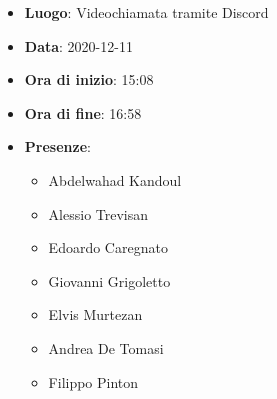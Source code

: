 \begin{itemize}
    \item \textbf{Luogo}: Videochiamata tramite Discord
    \item \textbf{Data}: 2020-12-11
    \item \textbf{Ora di inizio}: 15:08
    \item \textbf{Ora di fine}: 16:58
    \item \textbf{Presenze}:
          \begin{itemize}
              \item Abdelwahad Kandoul
              \item Alessio Trevisan
              \item Edoardo Caregnato
              \item Giovanni Grigoletto
              \item Elvis Murtezan
              \item Andrea De Tomasi
              \item Filippo Pinton
          \end{itemize}
\end{itemize}